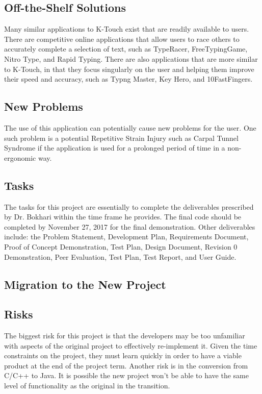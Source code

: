 \documentclass{article}
\begin{document}
\subsection{Off-the-Shelf Solutions}
\indent \indent Many similar applications to K-Touch exist that are readily available to users. There are competitive online applications that allow users to race others to accurately complete a selection of text, such as TypeRacer, FreeTypingGame, Nitro Type, and Rapid Typing. There are also applications that are more similar to K-Touch, in that they focus singularly on the user and helping them improve their speed and accuracy, such as Typng Master, Key Hero, and 10FastFingers.

\subsection{New Problems}
\indent \indent The use of this application can potentially cause new problems for the user. One such problem is a potential Repetitive Strain Injury such as Carpal Tunnel Syndrome if the application is used for a prolonged period of time in a non-ergonomic way. 

\subsection{Tasks}
\indent \indent The tasks for this project are essentially to complete the deliverables prescribed by Dr. Bokhari within the time frame he provides. The final code should be completed by November 27, 2017 for the final demonstration. Other deliverables include: the Problem Statement, Development Plan, Requirements Document, Proof of Concept Demonstration, Test Plan, Design Document, Revision 0 Demonstration, Peer Evaluation, Test Plan, Test Report, and User Guide.

\subsection{Migration to the New Project}


\subsection{Risks}
\indent \indent The biggest risk for this project is that the developers may be too unfamiliar with aspects of the original project to effectively re-implement it. Given the time constraints on the project, they must learn quickly in order to have a viable product at the end of the project term. Another risk is in the conversion from C/C++ to Java. It is possible the new project won't be able to have the same level of functionality as the original in the transition.
\end{document}
